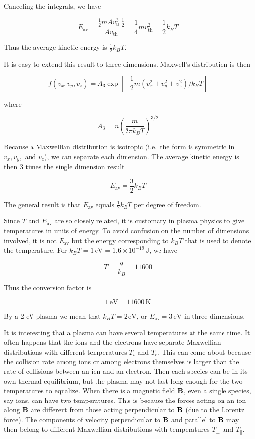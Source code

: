\documentclass[
  notoc %
]{tufte-book}
\begin{document}
Canceling the integrals, we have

\[
E_\text{av} = \frac{\frac{1}{2}mA v_\text{th}^3\frac{1}{2}}{A v_\text{th}} = \frac{1}{4}m v_\text{th}^2 = \frac{1}{2}k_B T
\]

Thus the average kinetic energy is \(\frac{1}{2}k_B T\).

It is easy to extend this result to three dimensions. Maxwell's
distribution is then

\[
f(v_x, v_y, v_z) = A_3 \exp\left[ -\frac{1}{2}m(v_x^2 + v_y^2 + v_z^2)/k_B T \right]
\]

where

\[
A_3 = n\left( \frac{m}{2\pi k_B T} \right)^{3/2}
\]

Because a Maxwellian distribution is isotropic (i.e.~the form is
symmetric in \(v_x,v_y,\) and \(v_z\)), we can separate each dimension.
The average kinetic energy is then 3 times the single dimension result

\[
E_\text{av} = \frac{3}{2}k_B T
\]

The general result is that \(E_\text{av}\) equals \(\frac{1}{2}k_B T\)
per degree of freedom.

Since \(T\) and \(E_\text{av}\) are so closely related, it is customary
in plasma physics to give temperatures in units of energy. To avoid
confusion on the number of dimensions involved, it is not
\(E_\text{av}\) but the energy corresponding to \(k_B T\) that is used
to denote the temperature. For
\(k_B T = 1\,\text{eV}=1.6\times 10^{-19}\,\text{J}\), we have

\[
T = \frac{q}{k_B} = 11600
\]

Thus the conversion factor is

\[
1\,\text{eV} = 11600\,\text{K}
\]

By a 2-eV plasma we mean that \(k_B T=2\,\text{eV}\), or
\(E_\text{av}=3\,\text{eV}\) in three dimensions.

It is interesting that a plasma can have several temperatures at the
same time. It often happens that the ions and the electrons have
separate Maxwellian distributions with different temperatures \(T_i\)
and \(T_e\). This can come about because the collision rate among ions
or among electrons themselves is larger than the rate of collisions
between an ion and an electron. Then each species can be in its own
thermal equilibrium, but the plasma may not last long enough for the two
temperatures to equalize. When there is a magnetic field \({\bf B}\),
even a single species, say ions, can have two temperatures. This is
because the forces acting on an ion along \({\bf B}\) are different from
those acting perpendicular to \({\bf B}\) (due to the Lorentz force).
The components of velocity perpendicular to \({\bf B}\) and parallel to
\({\bf B}\) may then belong to different Maxwellian distributions with
temperatures \(T_\perp\) and \(T_\parallel\).
\end{document}
